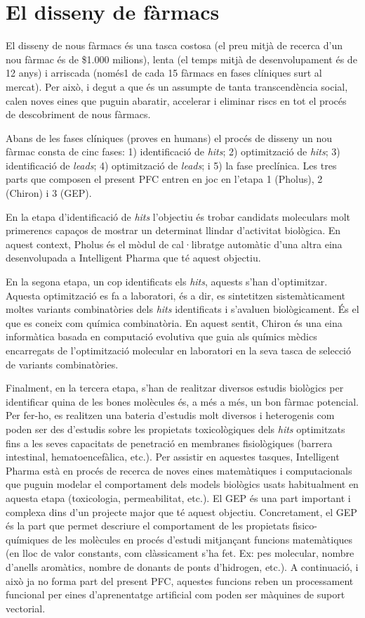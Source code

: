 \section{El disseny de fàrmacs}

El disseny de nous fàrmacs és una tasca costosa (el preu mitjà de recerca d’un
nou fàrmac és de \$1.000 milions), lenta (el temps mitjà de desenvolupament és de
12 anys) i arriscada (només1 de cada 15 fàrmacs en fases clíniques surt al
mercat). Per això, i degut a que és un assumpte de tanta transcendència social,
calen noves eines que puguin abaratir, accelerar i eliminar riscs en tot el
procés de descobriment de nous fàrmacs.

Abans de les fases clíniques (proves en humans) el procés de disseny un nou fàrmac consta de cinc fases: 1) identificació de \emph{hits}; 2) optimització de \emph{hits}; 3) identificació de \emph{leads}; 4) optimització de \emph{leads}; i 5) la fase preclínica. Les tres parts que composen el present PFC entren en joc en l’etapa 1 (Pholus), 2 (Chiron) i 3 (GEP).

En la etapa d’identificació de \emph{hits} l’objectiu és trobar candidats
moleculars molt primerencs capaços de mostrar un determinat llindar d’activitat
biològica. En aquest context, Pholus és el mòdul de cal·libratge automàtic d’una
altra eina desenvolupada a Intelligent Pharma que té aquest objectiu.

En la segona etapa, un cop identificats els \emph{hits}, aquests s’han
d'optimitzar. Aquesta optimització es fa a laboratori, és a dir, es sintetitzen
sistemàticament moltes variants combinatòries dels \emph{hits} identificats i
s’avaluen biològicament. És el que es coneix com química combinatòria. En aquest
sentit, Chiron és una eina informàtica basada en computació evolutiva que guia
als químics mèdics encarregats de l’optimització molecular en laboratori en la
seva tasca de selecció de variants combinatòries.

Finalment, en la tercera etapa, s’han de realitzar diversos estudis biològics
per identificar quina de les bones molècules és, a més a més, un bon fàrmac
potencial. Per fer-ho, es realitzen una bateria d’estudis molt diversos i
heterogenis com poden ser des d’estudis sobre les propietats toxicològiques dels
\emph{hits} optimitzats fins a les seves capacitats de penetració en membranes
fisiològiques (barrera intestinal, hematoencefàlica, etc.). Per assistir en
aquestes tasques, Intelligent Pharma està en procés de recerca de noves eines
matemàtiques i computacionals que puguin modelar el comportament dels models
biològics usats habitualment en aquesta etapa (toxicologia, permeabilitat,
etc.). El GEP és una part important i complexa dins d’un projecte major que té
aquest objectiu. Concretament, el GEP és la part que permet descriure el
comportament de les propietats fisico-químiques de les molècules en procés
d’estudi mitjançant funcions matemàtiques (en lloc de valor constants, com
clàssicament s’ha fet. Ex: pes molecular, nombre d’anells aromàtics, nombre de
donants de ponts d’hidrogen, etc.). A continuació, i això ja no forma part del
present PFC, aquestes funcions reben un processament funcional per eines
d’aprenentatge artificial com poden ser màquines de suport vectorial.

